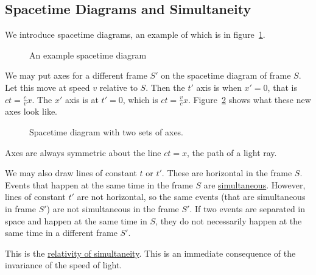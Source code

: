 \documentclass[../Main.tex]{subfiles}
\begin{document}
\subsection{Spacetime Diagrams and Simultaneity}
We introduce spacetime diagrams, an example of which is in figure~\ref{figSpacetimeDiagram}.
\begin{figure}[ht]
    \centering
    \caption{An example spacetime diagram}
    \label{figSpacetimeDiagram}
\end{figure}
We may put axes for a different frame $S'$ on the spacetime diagram of frame $S$. Let this move at speed $v$ relative to $S$. Then the $t'$ axis is when $x' = 0$, that is $ct = \frac{c}{v} x$. The $x'$ axis is at $t' = 0$, which is $ct = \frac{v}{c} x$. Figure~\ref{figSpacetimeDoubleAxis} shows what these new axes look like.
\begin{figure}[ht]
    \centering
    \caption{Spacetime diagram with two sets of axes.}    
    \label{figSpacetimeDoubleAxis}
\end{figure}
Axes are always symmetric about the line $ct = x$, the path of a light ray.\par
We may also draw lines of constant $t$ or $t'$. These are horizontal in the frame $S$. Events that happen at the same time in the frame $S$ are \underline{simultaneous}. However, lines of constant $t'$ are not horizontal, so the same events (that are simultaneous in frame $S'$) are not simultaneous in the frame $S'$. If two events are separated in space and happen at the same time in $S$, they do not necessarily happen at the same time in a different frame $S'$.\par
This is the \underline{relativity of simultaneity}. This is an immediate consequence of the invariance of the speed of light.\par
\end{document}
